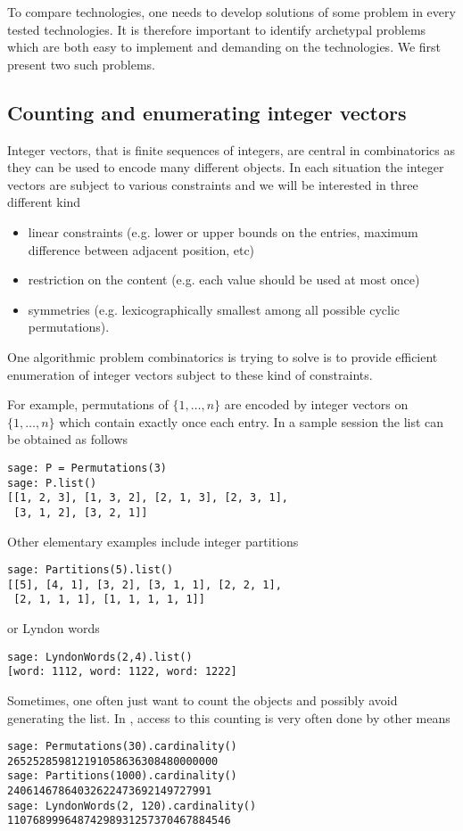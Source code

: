 \documentclass{deliverablereport}
\begin{document}
To compare technologies, one needs to develop solutions of some problem in
every tested technologies. It is therefore important to identify archetypal
problems which are both easy to implement and demanding on the technologies.
We first present two such problems.

\subsection{Counting and enumerating integer vectors}
\label{subsec:intro:integer:vectors}

Integer vectors, that is finite sequences of integers, are central
in combinatorics as they can be used to encode many different
objects. In each situation the integer vectors are subject to various
constraints and we will be interested in three different kind
\begin{itemize}
\item linear constraints (e.g. lower or upper bounds on the entries,
maximum difference between adjacent position, etc)
\item restriction on the content (e.g. each value should be used
at most once)
\item symmetries (e.g. lexicographically smallest among all possible
cyclic permutations).
\end{itemize}
One algorithmic problem combinatorics is trying to solve is to provide
efficient enumeration of integer vectors subject to these kind of
constraints.

For example, permutations of $\{1, \ldots, n\}$ are encoded by integer vectors
on $\{1, \ldots, n\}$ which contain exactly once each entry. In a sample
\Sage session the list can be obtained as follows
\begin{verbatim}
sage: P = Permutations(3)
sage: P.list()
[[1, 2, 3], [1, 3, 2], [2, 1, 3], [2, 3, 1],
 [3, 1, 2], [3, 2, 1]]
\end{verbatim}
Other elementary examples include integer partitions
\begin{verbatim}
sage: Partitions(5).list()
[[5], [4, 1], [3, 2], [3, 1, 1], [2, 2, 1],
 [2, 1, 1, 1], [1, 1, 1, 1, 1]]
\end{verbatim}
or Lyndon words
\begin{verbatim}
sage: LyndonWords(2,4).list()
[word: 1112, word: 1122, word: 1222]
\end{verbatim}

Sometimes, one often just want to count the objects and possibly avoid
generating the list. In \Sage, access to this counting is very often
done by other means
\begin{verbatim}
sage: Permutations(30).cardinality()
265252859812191058636308480000000
sage: Partitions(1000).cardinality()
24061467864032622473692149727991
sage: LyndonWords(2, 120).cardinality()
11076899964874298931257370467884546
\end{verbatim}
\end{document}
